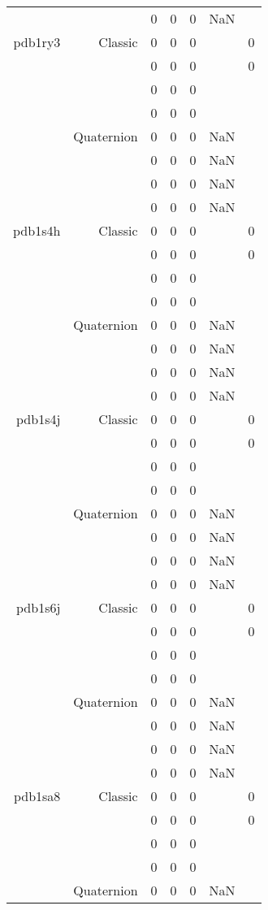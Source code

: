 \begin{xltabular}{\textwidth}{r|rcccSc}
& & 0 & 0 & 0 & NaN & \\ \addlinespace
pdb1ry3 & Classic & 0 & 0 & 0 & & 0 \\
& & 0 & 0 & 0 & & 0 \\
& & 0 & 0 & 0 & & \\
& & 0 & 0 & 0 & & \\
& Quaternion & 0 & 0 & 0 & NaN & \\
& & 0 & 0 & 0 & NaN & \\
& & 0 & 0 & 0 & NaN & \\
& & 0 & 0 & 0 & NaN & \\ \addlinespace
pdb1s4h & Classic & 0 & 0 & 0 & & 0 \\
& & 0 & 0 & 0 & & 0 \\
& & 0 & 0 & 0 & & \\
& & 0 & 0 & 0 & & \\
& Quaternion & 0 & 0 & 0 & NaN & \\
& & 0 & 0 & 0 & NaN & \\
& & 0 & 0 & 0 & NaN & \\
& & 0 & 0 & 0 & NaN & \\ \addlinespace
pdb1s4j & Classic & 0 & 0 & 0 & & 0 \\
& & 0 & 0 & 0 & & 0 \\
& & 0 & 0 & 0 & & \\
& & 0 & 0 & 0 & & \\
& Quaternion & 0 & 0 & 0 & NaN & \\
& & 0 & 0 & 0 & NaN & \\
& & 0 & 0 & 0 & NaN & \\
& & 0 & 0 & 0 & NaN & \\ \addlinespace
pdb1s6j & Classic & 0 & 0 & 0 & & 0 \\
& & 0 & 0 & 0 & & 0 \\
& & 0 & 0 & 0 & & \\
& & 0 & 0 & 0 & & \\
& Quaternion & 0 & 0 & 0 & NaN & \\
& & 0 & 0 & 0 & NaN & \\
& & 0 & 0 & 0 & NaN & \\
& & 0 & 0 & 0 & NaN & \\ \addlinespace
pdb1sa8 & Classic & 0 & 0 & 0 & & 0 \\
& & 0 & 0 & 0 & & 0 \\
& & 0 & 0 & 0 & & \\
& & 0 & 0 & 0 & & \\
& Quaternion & 0 & 0 & 0 & NaN & \\

\end{xltabular}
